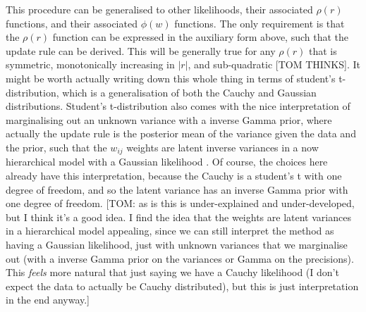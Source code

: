 \documentclass{article}
\begin{document}
This procedure can be generalised to other likelihoods, their associated $\rho(r)$ functions, and their associated $\phi(w)$ functions.
The only requirement is that the $\rho(r)$ function can be expressed in the auxiliary form above, such that the update rule can be derived.
This will be generally true for any $\rho(r)$ that is symmetric, monotonically increasing in $|r|$, and sub-quadratic [TOM THINKS].
It might be worth actually writing down this whole thing in terms of student's t-distribution, which is a generalisation of both the Cauchy and Gaussian distributions.
Student's t-distribution also comes with the nice interpretation of marginalising out an unknown variance with a inverse Gamma prior, where actually the update rule is the posterior mean of the variance given the data and the prior, such that the $w_{ij}$ weights are latent inverse variances in a now hierarchical model with a Gaussian likelihood \cite{things}.
Of course, the choices here already have this interpretation, because the Cauchy is a student's t with one degree of freedom, and so the latent variance has an inverse Gamma prior with one degree of freedom.
[TOM: as is this is under-explained and under-developed, but I think it's a good idea. I find the idea that the weights are latent variances in a hierarchical model appealing, since we can still interpret the method as having a Gaussian likelihood, just with unknown variances that we marginalise out (with a inverse Gamma prior on the variances or Gamma on the precisions). This \emph{feels} more natural that just saying we have a Cauchy likelihood (I don't expect the data to actually be Cauchy distributed), but this is just interpretation in the end anyway.]

\raggedright\footnotesize


\end{document}
